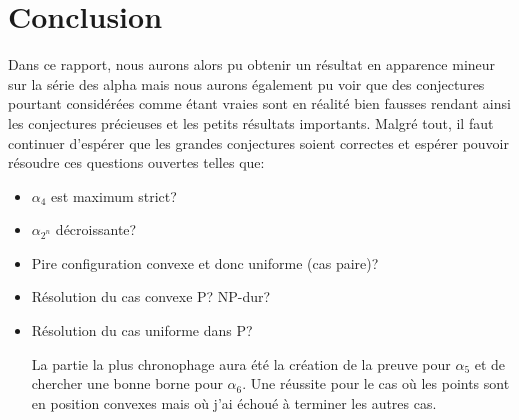 \section{Conclusion}

Dans ce rapport, nous aurons alors pu obtenir un résultat en apparence mineur sur la série des alpha mais nous aurons également pu voir que des conjectures pourtant considérées comme étant vraies sont en réalité bien fausses rendant ainsi les conjectures précieuses et les petits résultats importants. Malgré tout, il faut continuer d'espérer que les grandes conjectures soient correctes et espérer pouvoir résoudre ces questions ouvertes telles que:

\begin{itemize}

\item $\alpha_4$ est maximum strict?
\item $\alpha_{2^n}$ décroissante?
\item Pire configuration convexe et donc uniforme (cas paire)?
\item Résolution du cas convexe P? NP-dur?
\item Résolution du cas uniforme dans P?

La partie la plus chronophage aura été la création de la preuve pour $\alpha_5$ et de chercher une bonne borne pour $\alpha_6$. Une réussite pour le cas où les points sont en position convexes mais où j'ai échoué à terminer les autres cas.

\end{itemize}